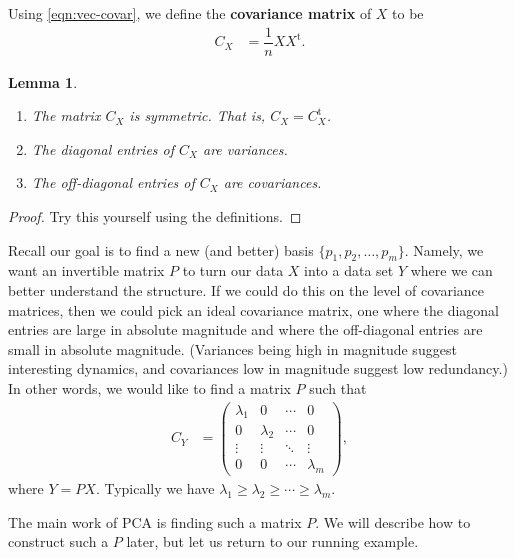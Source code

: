 \documentclass[a4paper, 12pt]{article}
\numberwithin{equation}{section}
\numberwithin{figure}{section}
\newtheorem{lem}[thm]{Lemma}
\theoremstyle{definition}
\renewcommand{\geq}{\geqslant}
\newcommand{\tr}{\mathrm{t}}
\begin{document}
Using \eqref{eqn:vec-covar}, we define the
\textbf{covariance matrix} of $X$ to be 
\begin{align*} 
	C_X &= \dfrac{1}{n} XX^{\tr} .
\end{align*} 

\begin{lem}\label{lem:covariance-properties}
	\hfill 
	\begin{enumerate}
		\item The matrix $C_X$ is symmetric. That is, $C_X = C_X^{\tr}$.
		\item The diagonal entries of $C_X$ are variances.
		\item The off-diagonal entries of $C_X$ are covariances.
	\end{enumerate}
\end{lem}

\begin{proof}
	Try this yourself using the definitions.
\end{proof}

Recall our goal is to find a new (and better) basis $\{p_1, p_2, \dots, p_m\}$.
Namely, we want an invertible matrix $P$ to turn our data $X$ into a data set
$Y$ where we can better understand the structure. If we could do this on the
level of covariance matrices, then we could pick an ideal covariance matrix, one
where the diagonal entries are large in absolute magnitude and where the
off-diagonal entries are small in absolute magnitude. (Variances being high in
magnitude suggest interesting dynamics, and covariances low in magnitude suggest
low redundancy.) In other words, we would like to find a matrix $P$ such that 
\begin{align}\label{eqn:cov-Y}
	C_Y &= \begin{pmatrix}
		\lambda_1 & 0 & \cdots & 0 \\
		0 & \lambda_2 & \cdots & 0 \\
		\vdots & \vdots & \ddots & \vdots \\
		0 & 0 & \cdots & \lambda_m
	\end{pmatrix},
\end{align}
where $Y = PX$. Typically we have $\lambda_1 \geq \lambda_2 \geq \cdots \geq \lambda_m$.

The main work of PCA is finding such a matrix $P$. We will describe how to
construct such a $P$ later, but let us return to our running example.  
\end{document}
